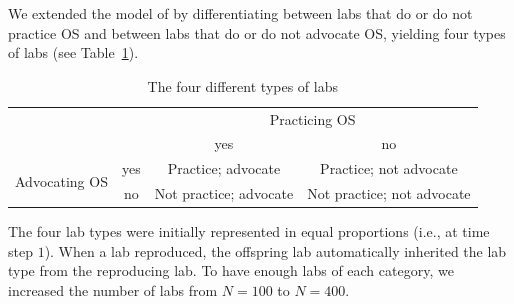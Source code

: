 \documentclass[meta, authordate]{jote-new-article}
\begin{document}
We extended the model of \textcite{SmaldinoMcelreath2016} by differentiating between labs that do or do not practice OS and between labs that do or do not advocate OS, yielding four types of labs (see Table~\ref{tab:labtypes}).
%

%
%
\begin{table}[]
  \centering
  \begin{fullwidth}

    \centering
    \caption{The four different types of labs}
    \label{tab:labtypes}
    \begin{tabular}{c c | c c}
                                     &     & \multicolumn{2}{c}{Practicing OS}                              \\
                                     &     & yes                               & no                         \\
      \hline
      \multirow{2}{*}{Advocating OS} & yes & Practice; advocate                & Practice; not advocate     \\
                                     & no  & Not practice; advocate            & Not practice; not advocate \\
    \end{tabular}
  \end{fullwidth}
\end{table}
%

The four lab types were initially represented in equal proportions (i.e., at time step $1$). When a lab reproduced, the offspring lab automatically inherited the lab type from the reproducing lab. To have enough labs of each category, we increased the number of labs from $N=100$ to $N=400$.
\end{document}
